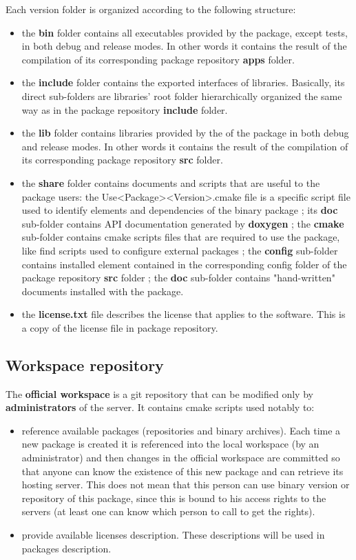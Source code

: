 \documentclass[12pt,a4paper]{article}
\begin{document}
Each version folder is organized according to the following structure:
\begin{itemize}
\item the \textbf{bin} folder contains all executables provided by the package, except tests, in both debug and release modes. In other words it contains the result of the compilation of its corresponding package repository \textbf{apps} folder.
\item the \textbf{include} folder contains the exported interfaces of libraries. Basically, its direct sub-folders are libraries' root folder hierarchically organized the same way as in the package repository \textbf{include} folder.
\item the \textbf{lib} folder contains libraries provided by the of the package in both debug and release modes.  In other words it contains the result of the compilation of its corresponding package repository \textbf{src} folder.
\item the \textbf{share} folder contains documents and scripts that are useful to the package users: the Use<Package><Version>.cmake file is a specific script file used to identify elements and dependencies of the binary package ; its \textbf{doc} sub-folder  contains API documentation generated by \textbf{doxygen} ; the \textbf{cmake} sub-folder contains cmake scripts files that are required to use the package, like find scripts used to configure external packages ; the \textbf{config} sub-folder contains installed element contained in the corresponding config folder of the package repository \textbf{src} folder ; the \textbf{doc} sub-folder contains "hand-written" documents installed with the package.
\item the \textbf{license.txt} file describes the license that applies to the software. This is a copy of the license file in package repository.
\end{itemize}

\subsection{Workspace repository}
\label{sec:workspaceRepository}

The \textbf{official workspace} is a git repository that can be modified only by \textbf{administrators} of the server. It contains cmake scripts used notably to:
\begin{itemize}
\item reference available packages (repositories and binary archives). Each time a new package is created it is referenced into the local workspace (by an administrator) and then changes in the official workspace are committed so that anyone can know the existence of this new package and can retrieve its hosting server. This does not mean that this person can use binary version or repository of this package, since this is bound to his access rights to the servers (at least one can know which person to call to get the rights).
\item provide available licenses description. These descriptions will be used in packages description.
\end{itemize}
\end{document}
